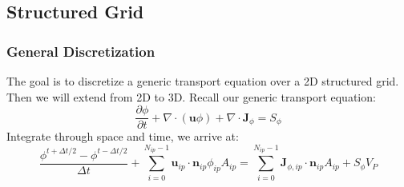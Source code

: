 \documentclass[11pt]{article}
\begin{document}
\subsection{Structured Grid}
\label{sec:org917ded8}
\subsubsection{General Discretization}
\label{sec:orgd2db997}
The goal is to discretize a generic transport equation over a 2D structured grid. Then we will extend
from 2D to 3D. Recall our generic transport equation:
\begin{equation*}
\frac{\partial \phi}{\partial t} + \nabla \cdot (\textbf{u}\phi) +
\nabla \cdot \textbf{J}_{\phi} = S_{\phi}
\end{equation*}
Integrate through space and time, we arrive at:
\begin{equation*}
\frac{\phi^{t+\Delta t / 2} - \phi^{t-\Delta t / 2}}{\Delta t}
+ \sum_{i=0}^{N_{ip}-1} \textbf{u}_{ip}\cdot \textbf{n}_{ip}\phi_{ip}A_{ip}
= \sum_{i=0}^{N_{ip}-1}\textbf{J}_{\phi,ip}\cdot \textbf{n}_{ip}A_{ip} + S_{\phi}V_P 
\end{equation*}
\end{document}
